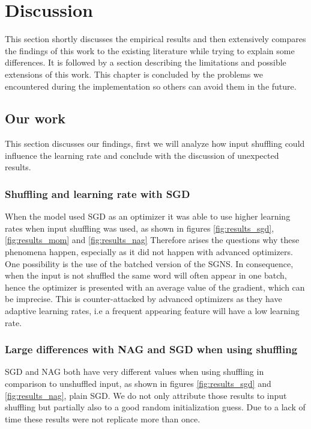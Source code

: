 \chapter{Discussion}\label{chap:discussion}

This section shortly discusses the empirical results and then extensively compares the findings of this work to the existing literature while trying to explain some differences. It is followed by a section describing the limitations and possible extensions of this work. This chapter is concluded by the problems we encountered during the implementation so others can avoid them in the future.

\section{Our work}
This section discusses our findings, first we will analyze how input shuffling could influence the learning rate and conclude with the discussion of unexpected results.

\subsection{Shuffling and learning rate with SGD}
When the model used SGD as an optimizer it was able to use higher learning rates when input shuffling was used, as shown in figures \ref{fig:results_sgd}, \ref{fig:results_mom} and \ref{fig:results_nag} Therefore arises the questions why these phenomena happen, especially as it did not happen with advanced optimizers. One possibility is the use of the batched version of the SGNS. In consequence, when the input is not shuffled the same word will often appear in one batch, hence the optimizer is presented with an average value of the gradient, which can be imprecise. This is counter-attacked by advanced optimizers as they have adaptive learning rates, i.e a frequent appearing feature will have a low learning rate.

\subsection{Large differences with NAG and SGD when using shuffling}
SGD and NAG both have very different values when using shuffling in comparison to unshuffled input, as shown in figures \ref{fig:results_sgd} and \ref{fig:results_nag}, plain SGD. We do not only attribute those results to input shuffling but partially also to a good random initialization guess. Due to a lack of time these results were not replicate more than once.

